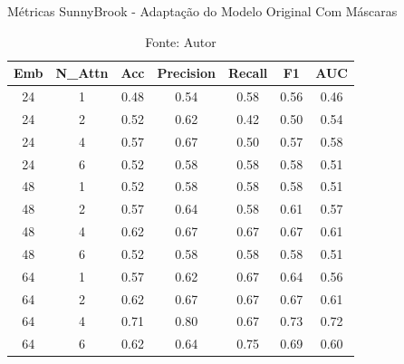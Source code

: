 \begin{table}[htbp]
\centering
\caption{Métricas SunnyBrook - Adaptação do Modelo Original Com Máscaras}
\begin{tabular}{ccccccc}
\toprule
\textbf{Emb} & \textbf{N\_Attn} & \textbf{Acc} & \textbf{Precision} & \textbf{Recall} & \textbf{F1} & \textbf{AUC} \\
\midrule
24 & 1 & 0.48 & 0.54 & 0.58 & 0.56 & 0.46 \\
24 & 2 & 0.52 & 0.62 & 0.42 & 0.50 & 0.54 \\
24 & 4 & 0.57 & 0.67 & 0.50 & 0.57 & 0.58 \\
24 & 6 & 0.52 & 0.58 & 0.58 & 0.58 & 0.51 \\
48 & 1 & 0.52 & 0.58 & 0.58 & 0.58 & 0.51 \\
48 & 2 & 0.57 & 0.64 & 0.58 & 0.61 & 0.57 \\
48 & 4 & 0.62 & 0.67 & 0.67 & 0.67 & 0.61 \\
48 & 6 & 0.52 & 0.58 & 0.58 & 0.58 & 0.51 \\
64 & 1 & 0.57 & 0.62 & 0.67 & 0.64 & 0.56 \\
64 & 2 & 0.62 & 0.67 & 0.67 & 0.67 & 0.61 \\
64 & 4 & 0.71 & 0.80 & 0.67 & 0.73 & 0.72 \\
64 & 6 & 0.62 & 0.64 & 0.75 & 0.69 & 0.60 \\
\bottomrule
\end{tabular}
\caption*{Fonte: Autor}
\label{tab:metrics_sunny_orig_mask}
\end{table}


